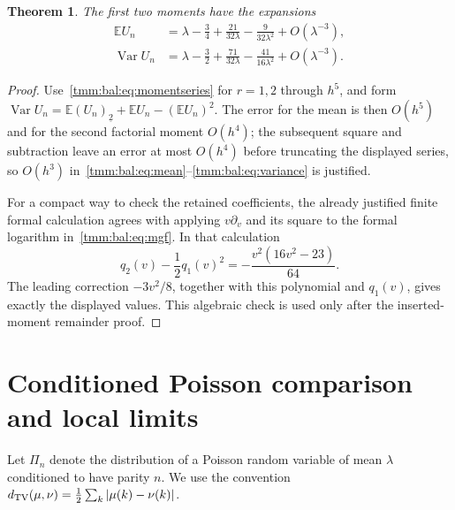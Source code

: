 \documentclass[11pt,letterpaper]{article}
\newtheorem{theorem}{Theorem}[section]
\theoremstyle{remark}\newtheorem{remark}[theorem]{Remark}
\newcommand{\E}{\mathbb E}\newcommand{\Pp}{\mathbb P}
\newcommand{\Var}{\operatorname{Var}}\newcommand{\Poi}{\operatorname{Poisson}}
\newcommand{\fall}[2]{(#1)_{\underline{#2}}}
\begin{document}
\begin{theorem}\label{tmm:bal:thm:moments}
The first two moments have the expansions
\begin{align}
 \E U_n&=\lambda-\frac34+\frac{21}{32\lambda}
                         -\frac9{32\lambda^2}+O(\lambda^{-3}),\label{tmm:bal:eq:mean}\\
 \Var U_n&=\lambda-\frac32+\frac{71}{32\lambda}
                         -\frac{41}{16\lambda^2}+O(\lambda^{-3}).\label{tmm:bal:eq:variance}
\end{align}
\end{theorem}
\begin{proof}
Use~\eqref{tmm:bal:eq:momentseries} for $r=1,2$ through $h^5$, and form
$\Var U_n=\E\fall{U_n}2+\E U_n-(\E U_n)^2$.
The error for the mean is then $O(h^5)$ and for the second factorial moment $O(h^4)$; the subsequent square and subtraction leave an error at most $O(h^4)$ before truncating the displayed series, so $O(h^3)$ in~\eqref{tmm:bal:eq:mean}--\eqref{tmm:bal:eq:variance} is justified.

For a compact way to check the retained coefficients, the already justified finite formal calculation agrees with applying $v\partial_v$ and its square to the formal logarithm in~\eqref{tmm:bal:eq:mgf}. In that calculation
\[
 q_2(v)-\frac12q_1(v)^2=-\frac{v^2(16v^2-23)}{64}.
\]
The leading correction $-3v^2/8$, together with this polynomial and $q_1(v)$, gives exactly the displayed values. This algebraic check is used only after the inserted-moment remainder proof.
\end{proof}

\section{Conditioned Poisson comparison and local limits}\label{tmm:bal:sec:limits}
Let $\Pi_n$ denote the distribution of a Poisson random variable of mean $\lambda$ conditioned to have parity $n$. We use the convention
$d_{\mathrm{TV}}(\mu,\nu)=\frac12\sum_k|\mu(k)-\nu(k)|$.
\end{document}
